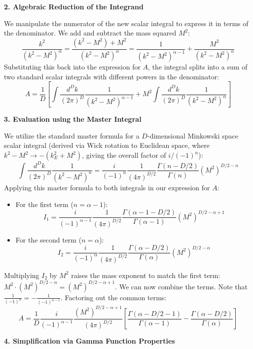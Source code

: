 \textbf{2. Algebraic Reduction of the Integrand}

We manipulate the numerator of the new scalar integral to express it in terms of the denominator. We add and subtract the mass squared $M^2$:
\[
    \frac{k^2}{(k^2 - M^2)^\alpha} = \frac{(k^2 - M^2) + M^2}{(k^2 - M^2)^\alpha} = \frac{1}{(k^2 - M^2)^{\alpha - 1}} + \frac{M^2}{(k^2 - M^2)^\alpha}
\]
Substituting this back into the expression for $A$, the integral splits into a sum of two standard scalar integrals with different powers in the denominator:
\[
    A = \frac{1}{D} \left[ \int \frac{d^D k}{(2\pi)^D} \frac{1}{(k^2 - M^2)^{\alpha - 1}} + M^2 \int \frac{d^D k}{(2\pi)^D} \frac{1}{(k^2 - M^2)^\alpha} \right]
\]

\textbf{3. Evaluation using the Master Integral}

We utilize the standard master formula for a $D$-dimensional Minkowski space scalar integral (derived via Wick rotation to Euclidean space, where $k^2 - M^2 \to -(k_E^2 + M^2)$, giving the overall factor of $i/(-1)^n$):
\[
    \int \frac{d^D k}{(2\pi)^D} \frac{1}{(k^2 - M^2)^n} = \frac{i}{(-1)^n} \frac{1}{(4\pi)^{D/2}} \frac{\Gamma(n - D/2)}{\Gamma(n)} (M^2)^{D/2 - n}
\]
Applying this master formula to both integrals in our expression for $A$:
\begin{itemize}
    \item For the first term ($n = \alpha - 1$):
          \[ I_1 = \frac{i}{(-1)^{\alpha-1}} \frac{1}{(4\pi)^{D/2}} \frac{\Gamma(\alpha - 1 - D/2)}{\Gamma(\alpha - 1)} (M^2)^{D/2 - \alpha + 1} \]
    \item For the second term ($n = \alpha$):
          \[ I_2 = \frac{i}{(-1)^\alpha} \frac{1}{(4\pi)^{D/2}} \frac{\Gamma(\alpha - D/2)}{\Gamma(\alpha)} (M^2)^{D/2 - \alpha} \]
\end{itemize}
Multiplying $I_2$ by $M^2$ raises the mass exponent to match the first term: $M^2 \cdot (M^2)^{D/2 - \alpha} = (M^2)^{D/2 - \alpha + 1}$.
We can now combine the terms. Note that $\frac{1}{(-1)^\alpha} = -\frac{1}{(-1)^{\alpha-1}}$. Factoring out the common terms:
\[
    A = \frac{1}{D} \frac{i}{(-1)^{\alpha-1}} \frac{(M^2)^{D/2 - \alpha + 1}}{(4\pi)^{D/2}} \left[ \frac{\Gamma(\alpha - D/2 - 1)}{\Gamma(\alpha - 1)} - \frac{\Gamma(\alpha - D/2)}{\Gamma(\alpha)} \right]
\]

\textbf{4. Simplification via Gamma Function Properties}

